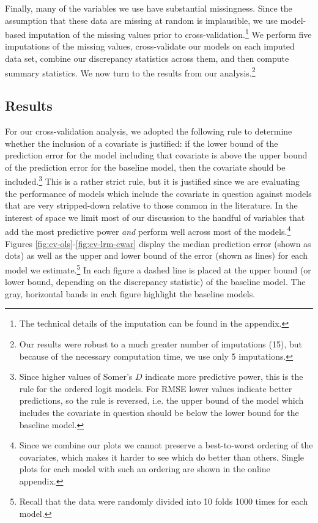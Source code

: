 \documentclass[12pt]{article}
\begin{document}
Finally, many of the variables we use have substantial missingness. Since the assumption that these data are missing at random is implausible, we use model-based imputation of the missing values prior to cross-validation.\footnote{The technical details of the imputation can be found in the appendix.} We perform five imputations of the missing values, cross-validate our models on each imputed data set, combine our discrepancy statistics across them, and then compute summary statistics. We now turn to the results from our analysis.\footnote{Our results were robust to a much greater number of imputations (15), but because of the necessary computation time, we use only 5 imputations.}

\subsection{Results}

For our cross-validation analysis, we adopted the following rule to determine whether the inclusion of a covariate is justified: if the lower bound of the prediction error for the model including that covariate is above the upper bound of the prediction error for the baseline model, then the covariate should be included.\footnote{Since higher values of Somer's $D$ indicate more predictive power, this is the rule for the ordered logit models. For RMSE lower values indicate better predictions, so the rule is reversed, i.e. the upper bound of the model which includes the covariate in question should be below the lower bound for the baseline model.} This is a rather strict rule, but it is justified since we are evaluating the performance of models which include the covariate in question against models that are very stripped-down relative to those common in the literature. In the interest of space we limit most of our discussion to the handful of variables that add the most predictive power {\em and} perform well across most of the models.\footnote{Since we combine our plots we cannot preserve a best-to-worst ordering of the covariates, which makes it harder to see which do better than others. Single plots for each model with such an ordering are shown in the online appendix.} Figures \ref{fig:cv-ols}-\ref{fig:cv-lrm-cwar} display the median prediction error (shown as dots) as well as the upper and lower bound of the error (shown as lines) for each model we estimate.\footnote{Recall that the data were randomly divided into 10 folds 1000 times for each model.} In each figure a dashed line is placed at the upper bound (or lower bound, depending on the discrepancy statistic) of the baseline model. The gray, horizontal bands in each figure highlight the baseline models. 
\end{document}

